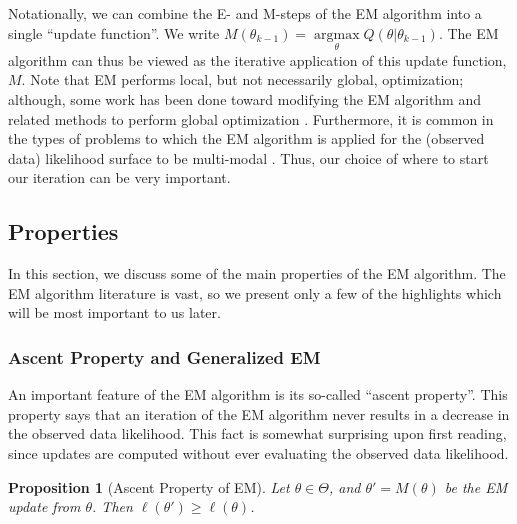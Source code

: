 \documentclass[11pt, oneside]{article}   	%
\DeclareMathOperator*{\argmax}{argmax}
\newtheorem{proposition}{Proposition}[section]
\begin{document}
Notationally, we can combine the E- and M-steps of the EM algorithm into a single ``update function''. We write $M(\theta_{k-1}) = \argmax\limits_\theta Q(\theta|\theta_{k-1})$. The EM algorithm can thus be viewed as the iterative application of this update function, $M$. Note that EM performs local, but not necessarily global, optimization; although, some work has been done toward modifying the EM algorithm and related methods to perform global optimization \citep{Jan06II, Jan06III}. Furthermore, it is common in the types of problems to which the EM algorithm is applied for the (observed data) likelihood surface to be multi-modal \citep{McL08}. Thus, our choice of where to start our iteration can be very important.

\subsection{Properties}

In this section, we discuss some of the main properties of the EM algorithm. The EM algorithm literature is vast, so we present only a few of the highlights which will be most important to us later.

\subsubsection{Ascent Property and Generalized EM}
\label{sec:GEM}

An important feature of the EM algorithm is its so-called ``ascent property''. This property says that an iteration of the EM algorithm never results in a decrease in the observed data likelihood. This fact is somewhat surprising upon first reading, since updates are computed without ever evaluating the observed data likelihood. 

\begin{proposition}[Ascent Property of EM]
    \label{thm2:EM_ascent}
    Let $\theta \in \Theta$, and $\theta' = M(\theta)$ be the EM update from $\theta$. Then $\ell(\theta') \geq \ell(\theta)$.
\end{proposition}
\end{document}
